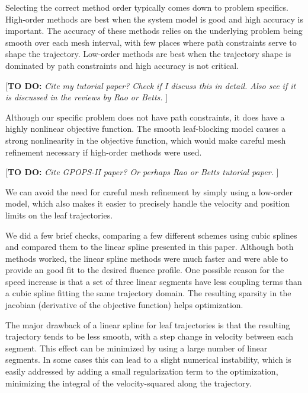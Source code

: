 \documentclass[12pt]{article}
\newcommand{\todo}[1]{{\color{lightblue}\par {[{\bf TO DO: } {\em #1}} ] \\    }}
\begin{document}
Selecting the correct method order typically comes down to problem specifics.
High-order methods are best when the system model is good and high accuracy is important.
The accuracy of these methods relies on the underlying problem being smooth over each
mesh interval, with few places where path constraints serve to shape the trajectory.
Low-order methods are best when the trajectory shape is dominated by path constraints and
high accuracy is not critical.
\todo{Cite my tutorial paper? Check if I discuss this in detail.
Also see if it is discussed in the reviews by Rao or Betts.}

Although our specific problem does not have path constraints, it does have a highly nonlinear objective function.
The smooth leaf-blocking model causes a strong nonlinearity in the objective function,
which would make careful mesh refinement necessary if high-order methods were used.
\todo{Cite GPOPS-II paper? Or perhaps Rao or Betts tutorial paper.}
We can avoid the need for careful mesh refinement by simply using a low-order model,
which also makes it easier to precisely handle the velocity and position limits on the leaf trajectories.

We did a few brief checks, comparing a few different schemes using cubic splines and compared them
to the linear spline presented in this paper. Although both methods worked, the linear spline methods
were much faster and were able to provide an good fit to the desired fluence profile.
One possible reason for the speed increase is that a set of three linear segments have less
coupling terms than a cubic spline fitting the same trajectory domain. The resulting sparsity in the
jacobian (derivative of the objective function) helps optimization. \cite{Betts2010}

The major drawback of a linear spline for leaf trajectories is that the resulting trajectory tends
to be less smooth, with a step change in velocity between each segment. This effect can be minimized
by using a large number of linear segments. In some cases this can lead to a slight numerical
instability, which is easily addressed by adding a small regularization term to the optimization,
minimizing the integral of the velocity-squared along the trajectory.




\end{document}
